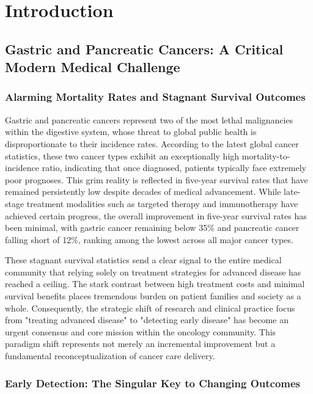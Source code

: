 
\chapter{Introduction} \label{chp:intro}

\section{Gastric and Pancreatic Cancers: A Critical Modern Medical Challenge}

\subsection{Alarming Mortality Rates and Stagnant Survival Outcomes}

Gastric and pancreatic cancers represent two of the most lethal malignancies within the digestive system, whose threat to global public health is disproportionate to their incidence rates. According to the latest global cancer statistics, these two cancer types exhibit an exceptionally high mortality-to-incidence ratio, indicating that once diagnosed, patients typically face extremely poor prognoses. This grim reality is reflected in five-year survival rates that have remained persistently low despite decades of medical advancement. While late-stage treatment modalities such as targeted therapy and immunotherapy have achieved certain progress, the overall improvement in five-year survival rates has been minimal, with gastric cancer remaining below 35\% and pancreatic cancer falling short of 12\%, ranking among the lowest across all major cancer types.

These stagnant survival statistics send a clear signal to the entire medical community that relying solely on treatment strategies for advanced disease has reached a ceiling. The stark contrast between high treatment costs and minimal survival benefits places tremendous burden on patient families and society as a whole. Consequently, the strategic shift of research and clinical practice focus from "treating advanced disease" to "detecting early disease" has become an urgent consensus and core mission within the oncology community. This paradigm shift represents not merely an incremental improvement but a fundamental reconceptualization of cancer care delivery.

\subsection{Early Detection: The Singular Key to Changing Outcomes}

